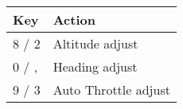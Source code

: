 \begin{tabular}{|l|l|}\hline
 Key           &         Action\\\hline
    8 / 2      &         Altitude adjust\\
    0 / ,      &         Heading adjust\\
    9 / 3      &         Auto Throttle adjust \\\hline
 \end{tabular}

